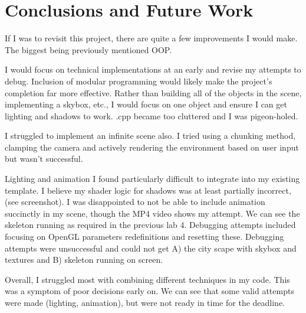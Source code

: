 \chapter{Conclusions and Future Work}

If I was to revisit this project, there are quite a few improvements I would make. The biggest being previously mentioned OOP.

I would focus on technical implementations at an early and revise my attempts to debug. Inclusion of modular programming would likely make the project's completion far more effective. Rather than building all of the objects in the scene, implementing a skybox, etc., I would focus on one object and ensure I can get lighting and shadows to work. .cpp became too cluttered and I was pigeon-holed. 

I struggled to implement an infinite scene also. I tried using a chunking method, clamping the camera and actively rendering the environment based on user input but wasn't successful. 

Lighting and animation I found particularly difficult to integrate into my existing template. I believe my shader logic for shadows was at least partially incorrect, (see screenshot). I was disappointed to not be able to include animation succinctly in my scene, though the MP4 video shows my attempt. We can see the skeleton running as required in the previous lab 4. Debugging attempts included focusing on OpenGL parameters redefinitions and resetting these. Debugging attempts were unsuccessful and could not get A) the city scape with skybox and textures and B) skeleton running on screen. 

Overall, I struggled most with combining different techniques in my code. This was a symptom of poor decisions early on. We can see that some valid attempts were made (lighting, animation), but were not ready in time for the deadline.